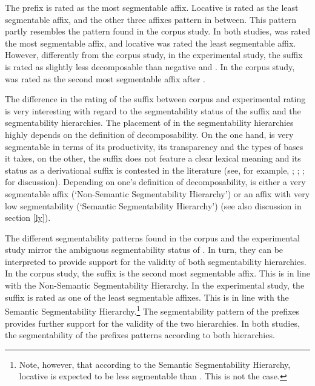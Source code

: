 \clearpage

The prefix  is rated as the most segmentable affix. 
 Locative  is rated as the least segmentable affix, and the other three affixes pattern in between. 
  This pattern partly resembles the pattern found in the corpus study. In both studies,  was rated the most segmentable affix, and locative  was rated the least segmentable affix. 
 However, differently from the corpus study, in the experimental study, the suffix  is rated as slightly less decomposable than negative  and . In the corpus study,  was rated as the second most segmentable affix after .


The difference in the rating of the suffix  between corpus and experimental rating is very interesting with regard to the segmentability status of the suffix and the segmentability hierarchies. The placement of  in the segmentability hierarchies highly depends on the definition of decomposability. On the one hand,  is very segmentable in terms of its productivity, its transparency and the types of bases it takes, on the other, the suffix does not feature a clear lexical meaning and its status as a derivational suffix is contested in the literature (see, for example, \citealt{Zwicky.1995}; \citealt{Plag.2003}; \citealt{Giegerich.2012}; \citealt{Bauer.2013} for discussion). Depending on one's definition of decomposability,  is either a very segmentable affix (`Non-Semantic Segmentability Hierarchy') or an affix with very low segmentability (`Semantic Segmentability Hierarchy') (see also discussion in section \ref{ly}). 

The different segmentability patterns found in the corpus and the experimental study mirror the ambiguous segmentability status of . In turn, they can be interpreted to provide support for the validity of both segmentability hierarchies. 
In the corpus study, the suffix  is the second most segmentable affix. This is in line with the Non-Semantic Segmentability Hierarchy. 
In the experimental study, the suffix  is rated as one of the least segmentable affixes. This is in line with the Semantic Segmentability Hierarchy.\footnote{Note, however, that according to the Semantic Segmentability Hierarchy, locative  is expected to be less segmentable than . This is not the case. }
The segmentability pattern of the prefixes provides further support for the validity of the two hierarchies. In both studies, the segmentability of the prefixes patterns according to both hierarchies. 




